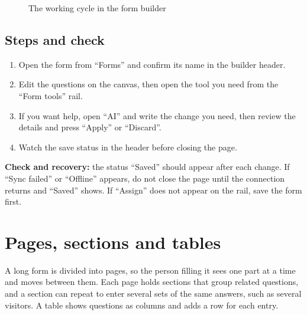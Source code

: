 \begin{figure}[H]
\centering
{}
\rclegend
\caption{The working cycle in the form builder}
\label{fig:builder-forms-builder-flow}
\end{figure}

\subsection{Steps and check}
\begin{enumerate}
\item Open the form from “Forms” and confirm its name in the builder header.
\item Edit the questions on the canvas, then open the tool you need from the “Form tools” rail.
\item If you want help, open “AI” and write the change you need, then review the details and press “Apply” or “Discard”.
\item Watch the save status in the header before closing the page.
\end{enumerate}

\textbf{Check and recovery:} the status “Saved” should appear after each change. If “Sync failed” or “Offline” appears, do not close the page until the connection returns and “Saved” shows. If “Assign” does not appear on the rail, save the form first.

\clearpage
\section{Pages, sections and tables}
\label{sec:builder-feature-forms-pages}

A long form is divided into pages, so the person filling it sees one part at a time and moves between them. Each page holds sections that group related questions, and a section can repeat to enter several sets of the same answers, such as several visitors. A table shows questions as columns and adds a row for each entry.

